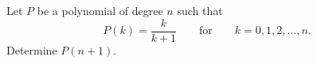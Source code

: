 Let $P$ be a polynomial of degree $n$ such that
$$P(k)=\frac{k}{k+1} \qquad \text{for} \qquad k=0,1,2, \ldots, n.$$
Determine $P(n+1)$.
